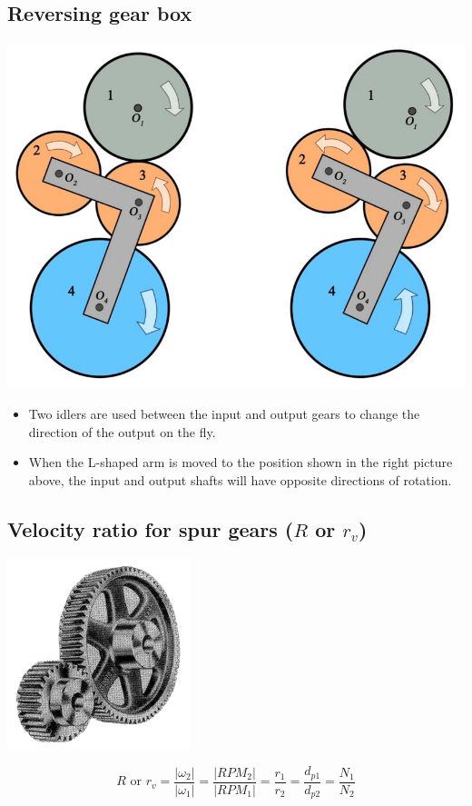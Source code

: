 \documentclass[11pt]{article}
\begin{document}
\subsection{Reversing gear box}
\label{sec:org0626d06}
\begin{center}
\includegraphics[width=.9\linewidth]{./images/reversing-gear-box-image.png}
\end{center}
\begin{itemize}
\item Two idlers are used between the input and output gears to change the direction of the output on the fly.
\item When the L-shaped arm is moved to the position shown in the right picture above, the input and output shafts will have opposite directions of rotation.
\end{itemize}
\subsection{Velocity ratio for spur gears (\(R\) or \(r_v\))}
\label{sec:orgbd09d42}
\begin{center}
\includegraphics[height=15em]{./images/double-stage-gear-reducer-image.png}
\end{center}
\[R \text{ or } r_v = \frac{|\omega_2|}{|\omega_1|} = \frac{|RPM_2|}{|RPM_1|} = \frac{r_1}{r_2} = \frac{d_{p1}}{d_{p2}} = \frac{N_1}{N_2}\]
\end{document}
